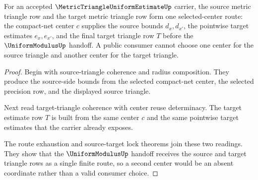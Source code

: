 \begin{theorem}
\label{thm:metric-triangle-uniform-estimate-source-target-two-triangle-route}
For an accepted $\MetricTriangleUniformEstimateUp$ carrier, the source metric triangle row and the target metric triangle row form one selected-center route: the compact-net center $c$ supplies the source bounds $d_x,d_{x'}$, the pointwise target estimates $e_x,e_{x'}$, and the final target triangle row $T$ before the $\UniformModulusUp$ handoff. A public consumer cannot choose one center for the source triangle and another center for the target triangle.
\end{theorem}
\begin{proof}
Begin with source-triangle coherence and radius composition. They produce the source-side bounds from the selected compact-net center, the selected precision row, and the displayed source triangle.

Next read target-triangle coherence with center reuse determinacy. The target estimate row $T$ is built from the same center $c$ and the same pointwise target estimates that the carrier already exposes.

The route exhaustion and source-target lock theorems join these two readings. They show that the $\UniformModulusUp$ handoff receives the source and target triangle rows as a single finite route, so a second center would be an absent coordinate rather than a valid consumer choice.
\end{proof}

